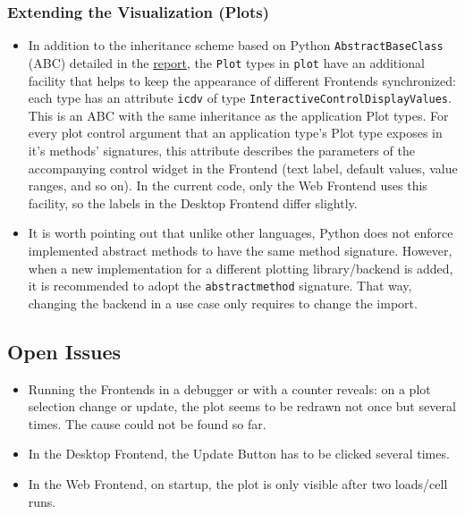 \subsubsection{Extending the Visualization
  (Plots)}\label{extending-the-visualization-plots}

\begin{itemize}
    \tightlist
\item
    In addition to the inheritance scheme based on Python
    \texttt{AbstractBaseClass} (ABC) detailed in the
    \href{./doc/report.pdf}{report}, the \texttt{Plot} types in
    \texttt{plot} have an additional facility that helps to keep the
    appearance of different Frontends synchronized: each type has an
    attribute \texttt{icdv} of type
    \texttt{InteractiveControlDisplayValues}. This is an ABC with the same
    inheritance as the application Plot types. For every plot control
    argument that an application type's Plot type exposes in it's methods'
    signatures, this attribute describes the parameters of the
    accompanying control widget in the Frontend (text label, default
    values, value ranges, and so on). In the current code, only the Web
    Frontend uses this facility, so the labels in the Desktop Frontend
    differ slightly.\\
\item
    It is worth pointing out that unlike other languages, Python does not
    enforce implemented abstract methods to have the same method
    signature. However, when a new implementation for a different plotting
    library/backend is added, it is recommended to adopt the
    \texttt{abstractmethod} signature. That way, changing the backend in a
    use case only requires to change the import.
\end{itemize}

\subsection{Open Issues}
\label{sec:open-issues}

\begin{itemize}
\item Running the Frontends in a debugger or with a counter reveals: on a plot
    selection change or update, the plot seems to be redrawn not once but
    several times. The cause could not be found so far.
\item In the Desktop Frontend, the Update Button has to be clicked several times.
\item In the Web Frontend, on startup, the plot is only visible after two loads/cell runs.   
\end{itemize}


